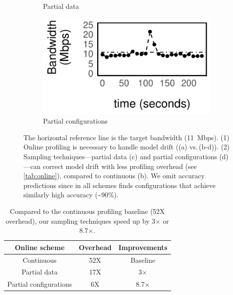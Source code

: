 \begin{figure}
\begin{subfigure}[t]{0.45\columnwidth}
    \caption{Partial data}
    \label{fig:online-partial}
  \end{subfigure}
  \hfill
  \begin{subfigure}[t]{0.45\columnwidth}
    \includegraphics[width=\textwidth]{figures/online4.pdf}
    \caption{Partial configurations}
    \label{fig:online-trigger}
  \end{subfigure}
  \caption{The horizontal reference line is the target bandwidth
    (\SI{11}{Mbps}). (1) Online profiling is necessary to handle model drift
    ((a) vs.\,(b-d)). (2) Sampling techniques---partial data (c) and partial
    configurations (d)---can correct model drift with less profiling overhead
    (see \autoref{tab:online}), compared to continuous (b).  We omit accuracy
    predictions since in all schemes \sysname{} finds configurations that
    achieve similarly high accuracy (\textasciitilde 90\%).  }
  \label{fig:online-tricks}
  \vspace{-0.5em}
\end{figure}

\begin{table}[t]
  \centering
  \begin{tabular}{c c c}
    \toprule
    Online scheme & Overhead & Improvements \\
    \midrule
    Continuous & 52X & Baseline \\
    Partial data & 17X & 3$\times$\\
    Partial configurations & 6X & 8.7$\times$ \\
    \bottomrule
  \end{tabular}
  \caption{Compared to the continuous profiling baseline (52X overhead), our
    sampling techniques speed up by 3$\times$ or 8.7$\times$.}
  \label{tab:online}
\end{table}

